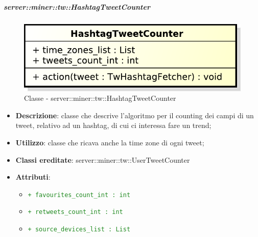 	\subparagraph{server::miner::tw::HashtagTweetCounter} %
		\label{subp:server_miner_tw_HashtagTweetCounter}
		    \begin{figure}[!htbp]
 		 		\centering
 				\centerline{\includegraphics[scale=0.75]{./images/server/classes/miner/hashtag_tweet_counter.pdf}}
 				\caption{Classe - server::miner::tw::HashtagTweetCounter}
			\end{figure}
			\begin{itemize}
				\item \textbf{Descrizione}: classe che descrive l'algoritmo per il counting dei campi di un tweet, relativo ad un hashtag, di cui ci interessa fare un trend;
				\item \textbf{Utilizzo}: classe che ricava anche la time zone di ogni tweet;
				\item \textbf{Classi ereditate}: server::miner::tw::UserTweetCounter
				\item \textbf{Attributi}:    
					\begin{itemize}
						\item \textcolor{forestgreen}{\texttt{+ favourites\_count\_int : int}}
						\item \textcolor{forestgreen}{\texttt{+ retweets\_count\_int : int}}
						\item \textcolor{forestgreen}{\texttt{+ source\_devices\_list : List}}
\end{itemize}
\end{itemize}
